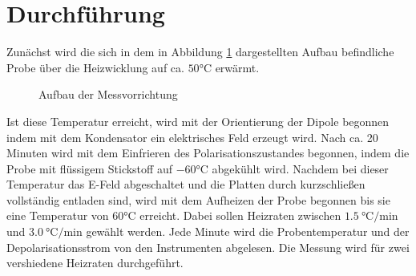 \section{Durchführung}
Zunächst wird die sich in dem in Abbildung \ref{fig:aufb}
dargestellten Aufbau befindliche Probe über die Heizwicklung auf ca. $50° \text{C}$ erwärmt.
\begin{figure}
\caption{Aufbau der Messvorrichtung \cite{V48}}
\label{fig:aufb}
\end{figure}
Ist diese Temperatur erreicht, wird mit der Orientierung der Dipole begonnen indem mit dem Kondensator
ein elektrisches Feld erzeugt wird. Nach ca. 20 Minuten wird mit dem Einfrieren des Polarisationszustandes begonnen,
indem die Probe mit flüssigem Stickstoff auf $-60° \text{C}$ abgekühlt wird. Nachdem bei dieser Temperatur das E-Feld abgeschaltet und die Platten
durch kurzschließen vollständig entladen sind, wird mit dem Aufheizen der Probe begonnen bis sie eine Temperatur von $60°\text{C}$ erreicht.
Dabei sollen Heizraten zwischen $\SI{1.5}{\celsius\per\minute}$ und $\SI{3.0}{\celsius\per\minute}$ gewählt werden. Jede Minute wird die Probentemperatur und
der Depolarisationsstrom von den Instrumenten abgelesen.
Die Messung wird für zwei vershiedene Heizraten durchgeführt.
